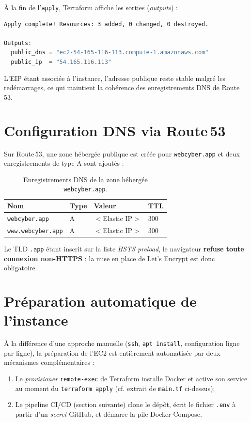 À la fin de l'\texttt{apply}, Terraform affiche les sorties (\textit{outputs}) :

\begin{lstlisting}[language=bash, caption={Sorties typiques après \texttt{apply}.}]
Apply complete! Resources: 3 added, 0 changed, 0 destroyed.

Outputs:
  public_dns = "ec2-54-165-116-113.compute-1.amazonaws.com"
  public_ip  = "54.165.116.113"
\end{lstlisting}

L'EIP étant associée à l'instance, l'adresse publique reste stable
malgré les redémarrages, ce qui maintient la cohérence des
enregistrements DNS de Route\,53.

\section{Configuration DNS via Route\,53}

Sur Route\,53, une zone hébergée publique est créée pour
\texttt{webcyber.app} et deux enregistrements de type A sont ajoutés :

\begin{table}[H]
\centering
\caption{Enregistrements DNS de la zone hébergée \texttt{webcyber.app}.}
\begin{tabular}{P{4cm} C{1.5cm} C{3cm} C{1.5cm}}
\toprule
\textbf{Nom} & \textbf{Type} & \textbf{Valeur} & \textbf{TTL} \\
\midrule
\texttt{webcyber.app}      & A & \(<\)Elastic IP\(>\) & 300 \\
\texttt{www.webcyber.app}  & A & \(<\)Elastic IP\(>\) & 300 \\
\bottomrule
\end{tabular}
\end{table}

Le TLD \texttt{.app} étant inscrit sur la liste \emph{HSTS preload},
le navigateur \textbf{refuse toute connexion non-HTTPS} : la mise en
place de Let's Encrypt est donc obligatoire.

\section{Préparation automatique de l'instance}

À la différence d'une approche manuelle (\texttt{ssh}, \texttt{apt
install}, configuration ligne par ligne), la préparation de l'EC2
est entièrement automatisée par deux mécanismes complémentaires :

\begin{enumerate}
  \item Le \emph{provisioner} \texttt{remote-exec} de Terraform installe
        Docker et active son service au moment du \texttt{terraform
        apply} (cf. extrait de \texttt{main.tf} ci-dessus);
  \item Le pipeline CI/CD (section suivante) clone le dépôt, écrit le
        fichier \texttt{.env} à partir d'un \emph{secret} GitHub, et
        démarre la pile Docker Compose.
\end{enumerate}

